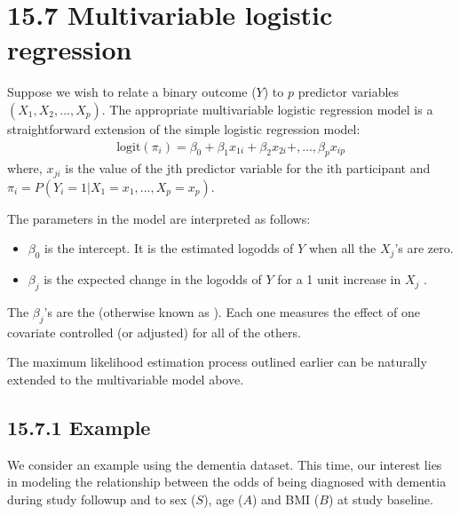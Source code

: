 \documentclass[letterpaper,10pt,english]{jupyterBook}
\begin{document}
\section{15.7 Multivariable logistic regression}
\label{\detokenize{15.h. Logistic Regression:multivariable-logistic-regression}}\label{\detokenize{15.h. Logistic Regression::doc}}
\sphinxAtStartPar
Suppose we wish to relate a binary outcome (\(Y\)) to \(p\) predictor variables \((X_1, X_2, ..., X_p)\). The appropriate multivariable logistic regression model is a straightforward extension of the simple logistic regression model:
\begin{equation*}
\begin{split}
\mathrm{logit}(\pi_i) = \beta_0 + \beta_1 x_{1i} + \beta_2 x_{2i} + ,..., \beta_p x_{ip}
\end{split}
\end{equation*}
\sphinxAtStartPar
where, \(x_{ji}\) is the value of the jth predictor variable for the ith participant and \(\pi_i = P(Y_i = 1 | X_1=x_1, ..., X_p=x_p)\).

\sphinxAtStartPar
The parameters in the model are interpreted as follows:
\begin{itemize}
\item {} 
\sphinxAtStartPar
\(\beta_0\) is the intercept. It is the estimated log\sphinxhyphen{}odds of \(Y\) when all the \(X_j\)’s are zero.

\item {} 
\sphinxAtStartPar
\(\beta_j\) is the expected change in the log\sphinxhyphen{}odds of \(Y\) for a 1 unit increase in \(X_j\) .

\end{itemize}

\sphinxAtStartPar
The \(\beta_j\)’s are the  (otherwise known as ). Each one measures the effect of one covariate controlled (or adjusted) for all of the others.

\sphinxAtStartPar
The maximum likelihood estimation process outlined earlier can be naturally extended to the multivariable model above.


\subsection{15.7.1 Example}
\label{\detokenize{15.h. Logistic Regression:example}}
\sphinxAtStartPar
We consider an example using the dementia dataset. This time, our interest lies in modeling the relationship between the odds of being diagnosed with dementia during study follow\sphinxhyphen{}up and to sex (\(S\)), age (\(A\)) and BMI (\(B\)) at study baseline.
\end{document}
